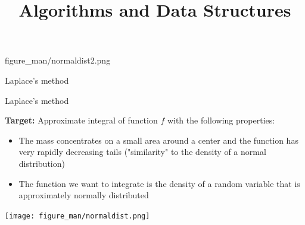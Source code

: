 \documentclass[11pt,compress,t,notes=noshow, xcolor=table]{beamer}
\title{Algorithms and Data Structures}
\begin{document}
{figure_man/normaldist2.png}
{
  \item Laplace's method
}


\begin{vbframe}{Laplace's method}


\textbf{Target:} Approximate integral of function $f$ with the following properties:

\begin{itemize}
\item The mass concentrates on a small area around a center and the function has very rapidly decreasing tails
("similarity" to the density of a normal distribution)
\item The function we want to integrate is the density of a random variable that is approximately normally distributed
\end{itemize}

%
%


\begin{center}
\texttt{[image: figure\_man/normaldist.png]}
\end{center}








\end{vbframe}
\end{document}
